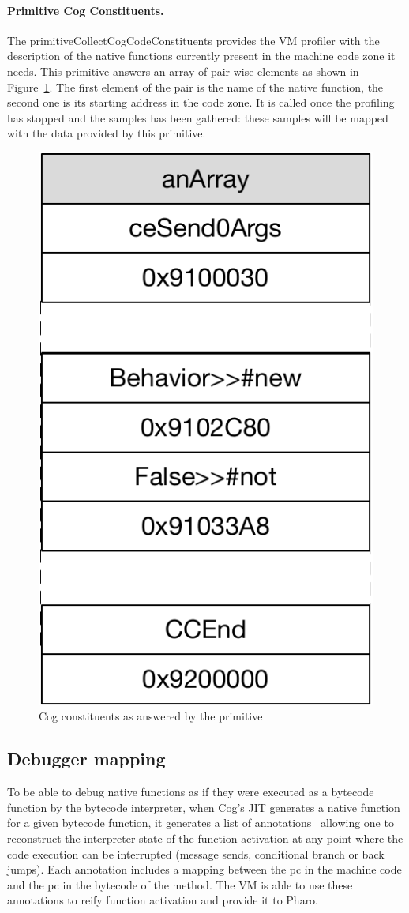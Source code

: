 \documentclass[10pt,preprint,nonatbib]{sigplanconf}
\newcommand{\figlabel}[1]{\label{fig:#1}}
\newcommand{\figref}[1]{Figure~\ref{fig:#1}}
\begin{document}
 
 \paragraph{Primitive Cog Constituents.}
The primitiveCollectCogCodeConstituents provides the VM profiler with the description of the native functions currently present in the machine code zone it needs. 
This primitive answers an array of pair-wise elements as shown in \figref{fig:ContentsOfCollectCogCodePrim}. The first element of the pair is the name of the native function, the second one is its starting address in the code zone.
It is called once the profiling has stopped and the samples has been gathered: these samples will be mapped with the data provided by this primitive.

 \begin{figure}[!htp]
     \begin{center}
         \includegraphics[width=0.4\linewidth]{ContentsOfCollectCogCodePrim}
         \caption{Cog constituents as answered by the primitive}
         \figlabel{fig:ContentsOfCollectCogCodePrim}
     \end{center}
 \end{figure}

 
\subsection{Debugger mapping}

To be able to debug native functions as if they were executed as a bytecode function by the bytecode interpreter, when Cog's JIT generates a native function for a given bytecode function, it generates a list of annotations~\cite{Ber16d} allowing one to reconstruct the interpreter state of the function activation at any point where the code execution can be interrupted (message sends, conditional branch or back jumps). Each annotation includes a mapping between the pc in the machine code and the pc in the bytecode of the method. The VM is able to use these annotations to reify function activation and provide it to Pharo.
 
\end{document}
